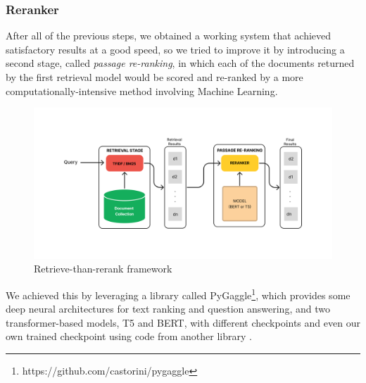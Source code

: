 \subsubsection{Reranker}
\label{subsubsec:reranker}

After all of the previous steps, we obtained a working system that achieved satisfactory results at a good speed, so we tried to improve it by introducing a second stage, called \textit{passage re-ranking}, in which each of the documents returned by the first retrieval model would be scored and re-ranked by a more computationally-intensive method involving Machine Learning. \\
\begin{figure}[tbp]
  \centering
  \includegraphics[width=0.8\linewidth]{figure/rerank_framework.png}
  \caption{Retrieve-than-rerank framework}
  \label{fig:rerank}
\end{figure}
We achieved this by leveraging a library called PyGaggle\footnote{https://github.com/castorini/pygaggle}, which provides some deep neural architectures for text ranking and question answering, and two transformer-based models, T5 and BERT, with different checkpoints and even our own trained checkpoint using code from another library \cite{gao2021lce}.

